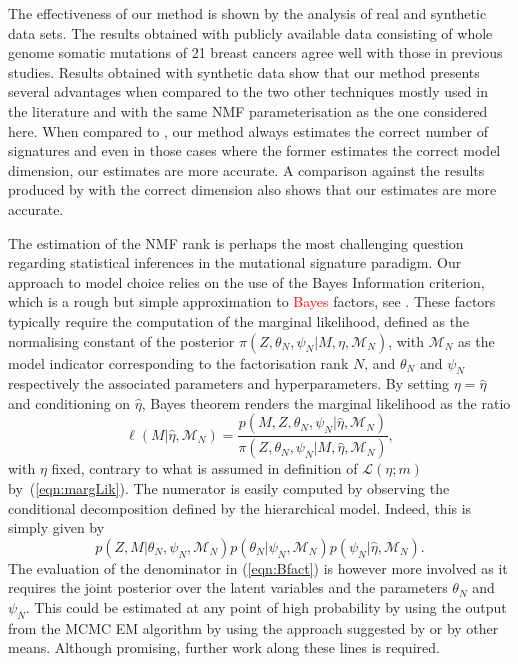 \documentclass{bioinfo}
\newcommand{\Mord}{\mathcal{M}_N}
\begin{document}
The effectiveness of our method is shown by the analysis of real and
synthetic data sets. The results obtained with publicly available
data consisting of whole genome somatic mutations of 21 breast
cancers agree well with those in previous studies. Results obtained
with synthetic data show that our method presents several advantages
when compared to the two other techniques mostly used in the
literature and with the same NMF parameterisation as the one
considered here. When compared to \cite{FICMV}, our
method always estimates the correct number of signatures and even in
those cases where the former estimates the correct model dimension,
our estimates are more accurate. A comparison against the results
produced by \cite{A} with the correct dimension also shows that
our estimates are more accurate.

The estimation of the NMF rank is perhaps the most challenging
question regarding statistical inferences in the mutational signature
paradigm. Our approach to model choice relies on the use of the Bayes
Information criterion, which is a rough but simple approximation to
\textcolor{red}{Bayes} factors, see \cite{KR}. These factors typically
require the computation of the marginal likelihood, defined as the
normalising constant of the posterior $\pi(Z, \theta_N, \psi_N|M,
\eta, \Mord)$, with $\Mord$ as the model indicator corresponding to
the factorisation rank $N$, and $\theta_N$ and $\psi_N$ respectively
the associated parameters and hyperparameters. By setting $\eta =
\hat\eta$ and conditioning on $\hat\eta$, Bayes theorem renders the
marginal likelihood as the ratio
\begin{equation}
  \label{eqn:Bfact}
   \ell(M|\hat \eta, \Mord)
  =
    \frac{p(M, Z, \theta_N, \psi_N|\hat\eta, \Mord)}
    {\pi(Z, \theta_N, \psi_N|M, \hat\eta, \Mord)},
\end{equation}
with $\eta$ fixed, contrary to what is assumed in definition of
$\mathcal L(\eta; m)$ by~(\ref{eqn:margLik}). The numerator is easily
computed by observing the conditional decomposition defined by the
hierarchical model. Indeed, this is simply given by
\[
  p(Z, M|\theta_N, \psi_N, \Mord) p(\theta_N|\psi_N, \Mord)
  p(\psi_N|\hat\eta, \Mord).
\]
The evaluation of the denominator in (\ref{eqn:Bfact}) is however more
involved as it requires the joint posterior over the latent variables
and the parameters $\theta_N$ and $\psi_N$. This could be estimated at
any point of high probability by using the output from the MCMC EM
algorithm by using the approach suggested by \cite{Ch} or by other
means. Although promising, further work along these lines is
required.
\end{document}
